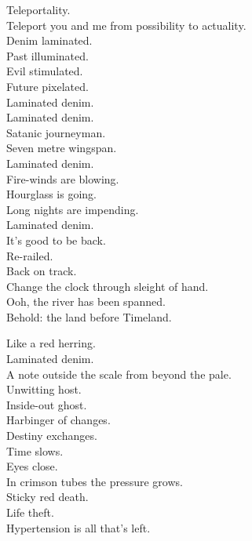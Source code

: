 Teleportality. \\
Teleport you and me from possibility to actuality. \\
Denim laminated. \\
Past illuminated. \\
Evil stimulated. \\
Future pixelated. \\

Laminated denim. \\

Laminated denim. \\
Satanic journeyman. \\
Seven metre wingspan. \\
Laminated denim. \\
Fire-winds are blowing. \\
Hourglass is going. \\
Long nights are impending. \\
Laminated denim. \\

It's good to be back. \\
Re-railed. \\
Back on track. \\
Change the clock through sleight of hand. \\
Ooh, the river has been spanned. \\
Behold: the land before Timeland. \\




Like a red herring. \\
Laminated denim. \\
A note outside the scale from beyond the pale. \\
Unwitting host. \\
Inside-out ghost. \\
Harbinger of changes. \\
Destiny exchanges. \\
Time slows. \\
Eyes close. \\
In crimson tubes the pressure grows. \\
Sticky red death. \\
Life theft. \\
Hypertension is all that's left. \\

